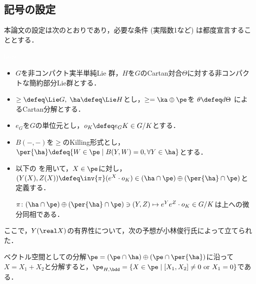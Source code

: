 
\subsection{記号の設定}
本論文の設定は次のとおりであり，必要な条件 (実階数1など) は都度宣言することとする．

\begin{nttdef}\textcolor{white}{hoge}

  \begin{itemize}
  \item $G$を非コンパクト実半単純Lie 群，$H$を$G$のCartan対合$\Theta$に対する非コンパクトな簡約部分Lie群とする．
  \item $\ge \defeq \Lie G,\; \ha \defeq \Lie H$とし，$\ge = \ka\oplus \pe$を $\theta \defeq d\Theta$ によるCartan分解とする．
  \item  $e_G$を$G$の単位元とし，$o_K \defeq e_GK\in G/K$とする．
  \item $B({-}, {-}) $を$\ge$のKilling形式とし，$\per{\ha} \defeq \{W\in \pe\mid B(Y, W) = 0 ,\forall Y\in \ha\} $とする．
  \item 以下の  を用いて，$X\in \pe$に対し，$(Y(X), Z(X))\defeq \inv{\pi}(e^X\cdot o_K)\in (\ha\cap\pe)\oplus (\per{\ha}\cap \pe)$と定義する．
    \begin{thm}\cite[Lemma~6.1]{kob89}\label{thm:kob89-lem6.1}

      $\pi\colon  (\ha\cap\pe)\oplus (\per{\ha}\cap \pe) \ni (Y, Z)\mapsto e^{Y}e^{Z}\cdot o_K \in G/K $は上への微分同相である．
    \end{thm}

  \end{itemize}
  
\end{nttdef}

ここで，$Y(\real X) $の有界性について，次の予想が小林俊行氏によって立てられた．

\begin{yosou}\label{yosou:1121}
  
  ベクトル空間としての分解$\pe =(\pe\cap \ha)\oplus(\pe\cap\per{\ha}) $に沿って$X = X_1 + X_2 $と分解すると，$\pe_{H,\bdd} = \{X\in \pe\mid [X_1, X_2]\neq 0 \text{ or } X_1 = 0 \}$である．
\end{yosou}

